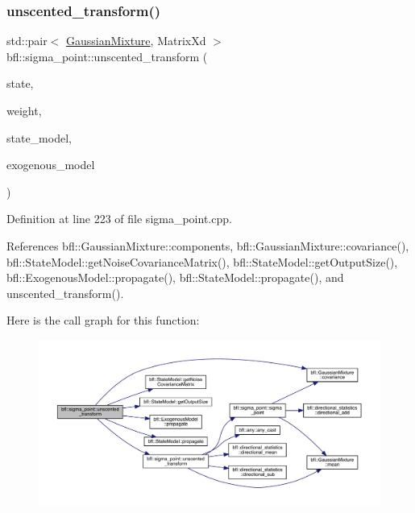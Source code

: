 \subsubsection{\texorpdfstring{unscented\+\_\+transform()}{unscented\_transform()}\hspace{0.1cm}{\footnotesize\ttfamily [5/8]}}
{\footnotesize\ttfamily std\+::pair$<$ \mbox{\hyperlink{classbfl_1_1GaussianMixture}{Gaussian\+Mixture}}, Matrix\+Xd $>$ bfl\+::sigma\+\_\+point\+::unscented\+\_\+transform (\begin{DoxyParamCaption}\item[{const \mbox{\hyperlink{classbfl_1_1GaussianMixture}{Gaussian\+Mixture}} \&}]{state,  }\item[{const \mbox{\hyperlink{structbfl_1_1sigma__point_1_1UTWeight}{U\+T\+Weight}} \&}]{weight,  }\item[{\mbox{\hyperlink{classbfl_1_1AdditiveStateModel}{Additive\+State\+Model}} \&}]{state\+\_\+model,  }\item[{\mbox{\hyperlink{classbfl_1_1ExogenousModel}{Exogenous\+Model}} \&}]{exogenous\+\_\+model }\end{DoxyParamCaption})}



Definition at line 223 of file sigma\+\_\+point.\+cpp.



References bfl\+::\+Gaussian\+Mixture\+::components, bfl\+::\+Gaussian\+Mixture\+::covariance(), bfl\+::\+State\+Model\+::get\+Noise\+Covariance\+Matrix(), bfl\+::\+State\+Model\+::get\+Output\+Size(), bfl\+::\+Exogenous\+Model\+::propagate(), bfl\+::\+State\+Model\+::propagate(), and unscented\+\_\+transform().

Here is the call graph for this function\+:
\nopagebreak
\begin{figure}[H]
\begin{center}
\leavevmode
\includegraphics[width=350pt]{namespacebfl_1_1sigma__point_aa14b7405b4800c5382d402b2446f89c6_cgraph}
\end{center}
\end{figure}
\mbox{\label{namespacebfl_1_1sigma__point_ad1df67122c8b838ae669d1f2e0665481}} 
